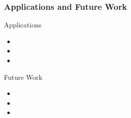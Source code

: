 \begin{frame}
  \frametitle{Applications and Future Work}
  \begin{block}{Applications}
    \begin{itemize}
      \item 
      \item 
      \item 
    \end{itemize}
  \end{block}
  \begin{block}{Future Work}
    \begin{itemize}
      \item 
      \item
      \item
    \end{itemize}
  \end{block}
\end{frame}
